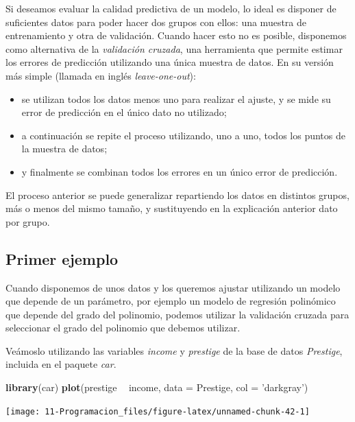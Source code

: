 \documentclass[]{book}
\newenvironment{Shaded}{\begin{snugshade}}{\end{snugshade}}
\newcommand{\DataTypeTok}[1]{\textcolor[rgb]{0.13,0.29,0.53}{#1}}
\newcommand{\KeywordTok}[1]{\textcolor[rgb]{0.13,0.29,0.53}{\textbf{#1}}}
\newcommand{\NormalTok}[1]{#1}
\newcommand{\OperatorTok}[1]{\textcolor[rgb]{0.81,0.36,0.00}{\textbf{#1}}}
\newcommand{\StringTok}[1]{\textcolor[rgb]{0.31,0.60,0.02}{#1}}
\begin{document}
Si deseamos evaluar la calidad predictiva de un modelo, lo ideal es disponer de
suficientes datos para poder hacer dos grupos con ellos: una muestra de entrenamiento
y otra de validación. Cuando hacer esto no es posible, disponemos como alternativa
de la \emph{validación cruzada}, una herramienta que permite estimar los errores de
predicción utilizando una única muestra de datos. En su versión más simple (llamada
en inglés \emph{leave-one-out}):

\begin{itemize}
\item
  se utilizan todos los datos menos uno para realizar el ajuste, y se mide su error de
  predicción en el único dato no utilizado;
\item
  a continuación se repite el proceso
  utilizando, uno a uno, todos los puntos de la muestra de datos;
\item
  y finalmente se combinan todos los errores en un único error de predicción.
\end{itemize}

El proceso anterior se puede generalizar repartiendo los datos en distintos grupos,
más o menos del mismo tamaño, y sustituyendo en la explicación anterior dato por grupo.

\hypertarget{primer-ejemplo}{%
\subsection{Primer ejemplo}\label{primer-ejemplo}}

Cuando disponemos de unos datos y los queremos ajustar utilizando un modelo que
depende de un parámetro, por ejemplo un modelo
de regresión polinómico que depende del grado del polinomio, podemos utilizar
la validación cruzada para seleccionar el grado del polinomio que debemos utilizar.

Veámoslo utilizando las variables \emph{income} y \emph{prestige} de la
base de datos \emph{Prestige}, incluida en el paquete \emph{car}.

\begin{Shaded}
\begin{Highlighting}[]
\KeywordTok{library}\NormalTok{(car)}
\KeywordTok{plot}\NormalTok{(prestige }\OperatorTok{~}\StringTok{ }\NormalTok{income, }\DataTypeTok{data =}\NormalTok{ Prestige, }\DataTypeTok{col =} \StringTok{'darkgray'}\NormalTok{)}
\end{Highlighting}
\end{Shaded}

\begin{center}\texttt{[image: 11-Programacion\_files/figure-latex/unnamed-chunk-42-1]} \end{center}
\end{document}

